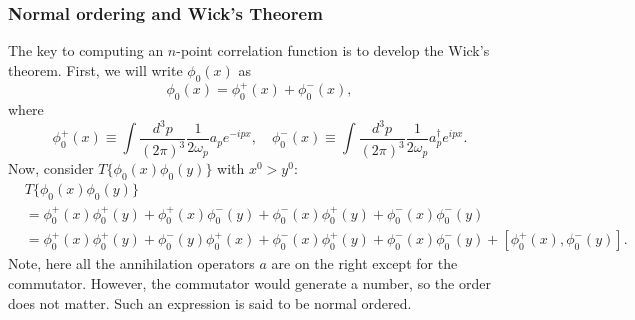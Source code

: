 \documentclass[11pt]{article}
\theoremstyle{definition}
\begin{document}
\subsubsection{Normal ordering and Wick's Theorem}
The key to computing an $n$-point correlation function is to develop the Wick's theorem. First, we will write $\phi_0(x)$ as
\begin{equation}
    \phi_0(x) = \phi_0^+(x) + \phi_0^-(x),
\end{equation}
where
\begin{equation}
    \phi_0^+(x) \equiv \int \frac{d^3p}{(2\pi)^3} \frac{1}{2\omega_p} a_p e^{-ipx}, \quad \phi_0^-(x) \equiv \int \frac{d^3p}{(2\pi)^3} \frac{1}{2\omega_p} a_p^\dagger e^{ipx}.
\end{equation}
Now, consider $T\{\phi_0(x)\phi_0(y)\}$ with $x^0 > y^0$:
\begin{equation}
\begin{aligned}
    &T\{\phi_0(x)\phi_0(y)\}\\
    &= \phi_0^+(x)\phi_0^+(y) + \phi_0^+(x)\phi_0^-(y) + \phi_0^-(x)\phi_0^+(y) + \phi_0^-(x)\phi_0^-(y)\\
    &= \phi_0^+(x)\phi_0^+(y) + \phi_0^-(y)\phi_0^+(x) + \phi_0^-(x)\phi_0^+(y) + \phi_0^-(x)\phi_0^-(y) + [\phi_0^+(x), \phi_0^-(y)].
    \label{Eq. Wick 1}
\end{aligned}
\end{equation}
Note, here all the annihilation operators $a$ are on the right except for the commutator. However, the commutator would generate a number, so the order does not matter. Such an expression is said to be normal ordered.
\end{document}
